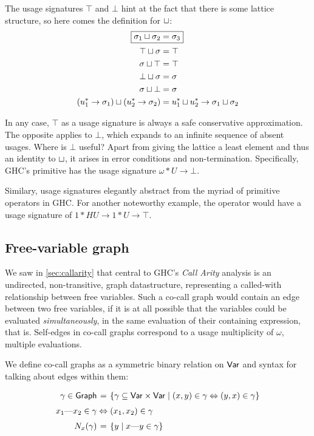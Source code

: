 The usage signatures $\top$ and $\bot$ hint at the fact that there is some lattice structure, so here comes the definition for $\sqcup$:
\begin{alignat*}{1}
  \Aboxed{\sigma_1 \llub \sigma_2 &= \sigma_3} \\
  \top \llub \sigma &= \top \\
  \sigma \llub \top &= \top \\
  \bot \llub \sigma &= \sigma \\
  \sigma \llub \bot &= \sigma \\
  (u^*_1 \to \sigma_1) \llub (u^*_2 \to \sigma_2) &= u^*_1 \llub u^*_2 \to \sigma_1 \llub \sigma_2 \\
\end{alignat*}

In any case, $\top$ as a usage signature is always a safe conservative approximation. 
The opposite applies to $\bot$, which expands to an infinite sequence of absent usages. 
Where is $\bot$ useful? 
Apart from giving the lattice a least element and thus an identity to $\sqcup$, it arises in error conditions and non-termination. 
Specifically, GHC's primitive  has the usage signature $\omega*U \to \bot$.

Similary, usage signatures elegantly abstract from the myriad of primitive operators in GHC.
For another noteworthy example, the  operator would have a usage signature of $1*HU \to 1*U \to \top$.

\subsection{Free-variable graph}\label{sec:graph}

We saw in \cref{sec:callarity} that central to GHC's \emph{Call Arity} analysis \parencite{callarity} is an undirected, non-transitive, graph datastructure, representing a called-with relationship between free variables.
Such a co-call graph would contain an edge between two free variables, if it is at all possible that the variables could be evaluated \emph{simultaneously}, in the same evaluation of their containing expression, that is.
Self-edges in co-call graphs correspond to a usage multiplicity of $\omega$, \eg multiple evaluations.

We define co-call graphs as a symmetric binary relation on $\text{\textsf{Var}}$ and syntax for talking about edges within them:
\[\def\arraystretch{1.5}\arraycolsep=1.4pt
\begin{array}{rcl}
  \gamma \in \sGraph &=& \left\{ \gamma \subseteq \sVar \times \sVar \mid (x,y) \in \gamma \Leftrightarrow (y,x) \in \gamma \right\} \\
  \edge{x_1}{x_2}\in\gamma &\Leftrightarrow& (x_1,x_2) \in \gamma \\
  \neighbors{x}{\gamma} &=& \left\{ y \mid \edge{x}{y} \in \gamma \right\}
\end{array}
\]

